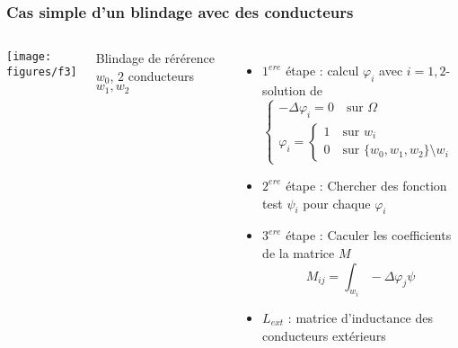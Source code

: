 \begin{frame}
\frametitle{Cas simple d'un blindage avec des conducteurs}
\begin{columns}[T]
\begin{center}
\texttt{[image: figures/f3]}
\end{center}
Blindage de r\'er\'erence $w_0$, $2$ conducteurs $w_1, w_2$
\begin{itemize}
\item $1^{ere}$ \'etape : calcul $\varphi_i$ avec $i=1,2$-solution de
 \begin{equation}
 \begin{cases}
 -\Delta\varphi_i = 0 \quad \text{sur } \Omega \\
 \varphi_i =  
 \begin{cases}
 1 \quad \text{sur } w_i \\
 0 \quad \text{sur } \{w_0,w_1,w_2 \} \setminus w_i
 \end{cases}
 \end{cases}
 \end{equation}
\item $2^{ere}$ \'etape : Chercher des fonction test $\psi_i$ pour chaque $\varphi_i$
\item $3^{ere}$ \'etape : Caculer les coefficients de la matrice $M$
\begin{equation}
M_{ij} = \int_{w_i} -\Delta\varphi_j \psi 
\end{equation}
\item $L_{ext}$ : matrice d'inductance des conducteurs ext\'erieurs  
\end{itemize}
\end{columns}
\end{frame} 

